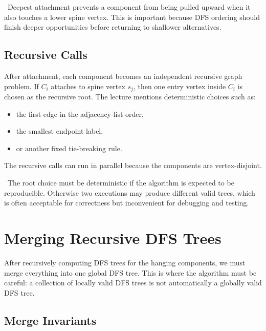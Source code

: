 \begin{ppkey}
\ Deepest attachment prevents a component from being pulled upward when it also touches a lower spine vertex.
This is important because DFS ordering should finish deeper opportunities before returning to shallower alternatives.
\end{ppkey}

\subsection{Recursive Calls}

After attachment, each component becomes an independent recursive graph problem.
If \(C_i\) attaches to spine vertex \(s_j\), then one entry vertex inside \(C_i\) is chosen as the recursive root.
The lecture mentions deterministic choices such as:

\begin{itemize}
    \item the first edge in the adjacency-list order,
    \item the smallest endpoint label,
    \item or another fixed tie-breaking rule.
\end{itemize}

The recursive calls can run in parallel because the components are vertex-disjoint.

\begin{pppitfall}
\ The root choice must be deterministic if the algorithm is expected to be reproducible.
Otherwise two executions may produce different valid trees, which is often acceptable for correctness but inconvenient for debugging and testing.
\end{pppitfall}

\section{Merging Recursive DFS Trees}
\label{sec:parallel-tree-merging}

After recursively computing DFS trees for the hanging components, we must merge everything into one global DFS tree.
This is where the algorithm must be careful: a collection of locally valid DFS trees is not automatically a globally valid DFS tree.

\subsection{Merge Invariants}

